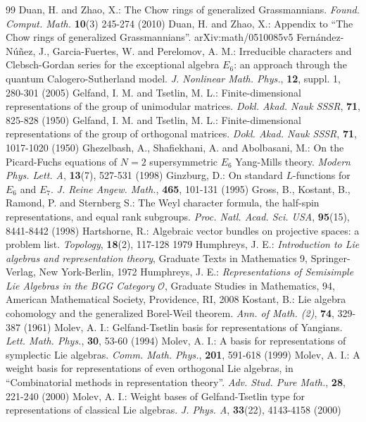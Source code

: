 \documentclass[12pt]{article}
\numberwithin{equation}{section}
\theoremstyle{definition}
\theoremstyle{remark}
\begin{document}
\begin{thebibliography}{99}
	 Duan, H. and Zhao, X.: The Chow rings of generalized Grassmannians. {\it Found. Comput. Math.} {\bf 10}(3) 245-274 (2010)
	 Duan, H. and Zhao, X.: Appendix to ``The Chow rings of generalized Grassmannians''. arXiv:math/0510085v5
	 Fernández-Núñez, J., Garcia-Fuertes, W.  and Perelomov, A. M.: Irreducible characters and Clebsch-Gordan series for the exceptional algebra $E_6$: an approach through the quantum Calogero-Sutherland model. {\it J. Nonlinear Math. Phys.}, {\bf 12}, suppl. 1, 280-301 (2005)
	 Gelfand, I. M. and Tsetlin, M. L.: Finite-dimensional representations of the group of unimodular matrices. {\it Dokl. Akad. Nauk SSSR}, {\bf 71}, 825-828 (1950)
	 Gelfand, I. M. and Tsetlin, M. L.: Finite-dimensional representations of the group of orthogonal matrices. {\it Dokl. Akad. Nauk SSSR}, {\bf 71}, 1017-1020 (1950)
	 Ghezelbash, A., Shafiekhani, A. and Abolbasani, M.: On the Picard-Fuchs equations of $N=2$ supersymmetric $E_6$ Yang-Mills theory. {\it Modern Phys. Lett. A}, {\bf 13}(7), 527-531 (1998) 
	 Ginzburg, D.: On standard $L$-functions for $E_6$ and $E_7$. {\it J. Reine Angew. Math.}, {\bf 465}, 101-131 (1995)
	 Gross, B., Kostant, B., Ramond, P. and Sternberg S.: The Weyl character formula, the half-spin representations, and equal rank subgroups. {\it Proc. Natl. Acad. Sci. USA}, {\bf 95}(15), 8441-8442 (1998)
	 Hartshorne, R.: Algebraic vector bundles on projective spaces: a problem list. {\it Topology}, {\bf 18}(2), 117-128 1979
	 Humphreys, J. E.: {\it Introduction to Lie algebras and representation theory}, Graduate Texts in Mathematics 9, Springer-Verlag, New York-Berlin, 1972
	 Humphreys, J. E.: {\it Representations of Semisimple Lie Algebras in the BGG Category $\mathcal{O}$}, Graduate Studies in Mathematics, 94, American Mathematical Society, Providence, RI, 2008
	 Kostant, B.: Lie algebra cohomology and the generalized Borel-Weil theorem. {\it Ann. of Math. (2)}, {\bf 74}, 329-387 (1961)
	 Molev, A. I.: Gelfand-Tsetlin basis for representations of Yangians. {\it Lett. Math. Phys.}, {\bf 30}, 53-60 (1994)
	 Molev, A. I.: A basis for representations of symplectic Lie algebras. {\it Comm. Math. Phys.}, {\bf 201}, 591-618 (1999)
	 Molev, A. I.: A weight basis for representations of even orthogonal Lie algebras, in {``Combinatorial methods in representation theory''}. {\it Adv. Stud. Pure Math.}, {\bf 28}, 221-240 (2000)
	 Molev, A. I.: Weight bases of Gelfand-Tsetlin type for representations of classical Lie algebras. {\it J. Phys. A}, {\bf 33}(22), 4143-4158 (2000)

\end{thebibliography}
\end{document}
